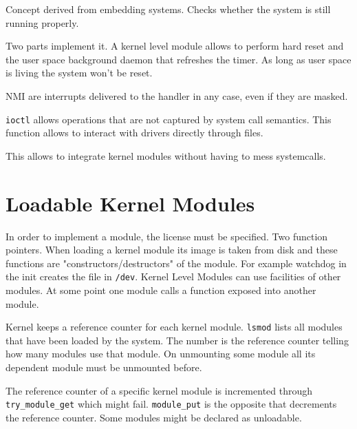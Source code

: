 \documentclass[twoside]{article}
\begin{document}
Concept derived from embedding systems. Checks whether the system is still
running properly.

Two parts implement it. A kernel level module allows to perform hard reset and
the user space background daemon that refreshes the timer. As long as user space
is living the system won't be reset.

NMI are interrupts delivered to the handler in any case, even if they are
masked.

\texttt{ioctl} allows operations that are not captured by system call semantics.
This function allows to interact with drivers directly through files.

This allows to integrate kernel modules without having to mess systemcalls.

\section{Loadable Kernel Modules}
\label{sec:Loadable Kernel Modules}

In order to implement a module, the license must be specified. Two function
pointers. When loading a kernel module its image is taken from disk and these
functions are "constructors/destructors" of the module. For example watchdog in
the init creates the file in \texttt{/dev}. Kernel Level Modules can use
facilities of other modules. At some point one module calls a function exposed
into another module.

Kernel keeps a reference counter for each kernel module. \texttt{lsmod} lists
all modules that have been loaded by the system. The number is the reference
counter telling how many modules use that module. On unmounting some module all
its dependent module must be unmounted before.

The reference counter of a specific kernel module is incremented through
\texttt{try_module_get} which might fail. \texttt{module_put} is the opposite
that decrements the reference counter. Some modules might be declared as
unloadable.

\newpage


\end{document}
